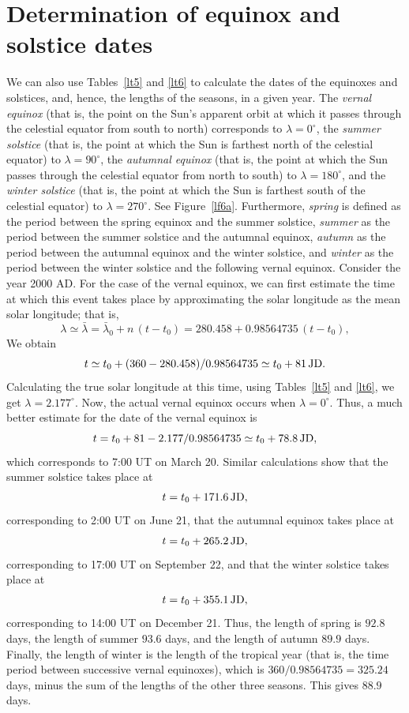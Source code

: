 \section{Determination of equinox and solstice dates}
We can also use Tables~\ref{lt5} and \ref{lt6} to calculate the dates of the equinoxes and solstices,
and, hence, the lengths of the seasons, in a given year. The {\em vernal equinox}\/ (that is, the point on the Sun's apparent orbit at which it passes through the celestial equator
from south to north)
corresponds to $\lambda=0^\circ$, the {\em summer solstice}\/ (that is, the
point at which the Sun is farthest north of the celestial equator) to $\lambda=90^\circ$, the {\em autumnal equinox}\/ (that is, the point at which the
Sun passes through the celestial equator from north to south) to $\lambda = 180^\circ$, and the
{\em winter solstice}\/ (that is, the point at which the Sun is farthest south of the celestial equator) to $\lambda = 270^\circ$. See Figure~\ref{lf6a}. Furthermore, {\em spring}\/ is defined as the period between the spring
equinox and the summer solstice, {\em summer}\/ as the period between the summer solstice and
the autumnal equinox, {\em autumn}\/ as the period between the autumnal equinox and the
winter solstice, and {\em winter}\/ as the period between the winter solstice and the following
vernal equinox. Consider the year 2000 AD.
For the case of the vernal equinox, we can
 first estimate the
 time at which this event takes place by approximating the solar
 longitude as the  mean
solar longitude; that is, 
$$
\lambda\simeq \bar{\lambda} = \bar{\lambda}_0 + n\,(t-t_0)
= 280.458 +  0.98564735\,(t-t_0),
$$
 We obtain 
$$
t \simeq t_0+(360-280.458)/0.98564735 \simeq t_0+81\,{\rm JD}.
$$ 
Calculating the true solar longitude at this time, using Tables~\ref{lt5} and \ref{lt6}, we get  
$\lambda = 2.177^\circ.$ Now, the actual vernal equinox occurs
when $\lambda=0^\circ$.
Thus, a much better estimate for the date of the vernal equinox
is
$$
t = t_0 + 81 -2.177/0.98564735 \simeq t_0 + 78.8\,{\rm JD},
$$
 which
corresponds to 7:00 UT on March 20. Similar calculations show that the summer solstice takes place at 
$$
t = t_0+ 171.6\, {\rm JD},
$$
corresponding to 2:00 UT on June 21, that the autumnal equinox
takes place at 
$$
t = t_0+265.2\,{\rm JD},
$$
corresponding to 17:00 UT
on September 22, and that the winter solstice takes place at
$$
t =t_0+355.1\, {\rm JD},
$$
corresponding to 14:00 UT on December 21. 
Thus, the length of spring is $92.8$ days,
the length of summer $93.6$ days,
and the length of autumn  $89.9$ days.
Finally, the length of winter is the length
of the tropical year (that is, the time period between successive vernal equinoxes), which is $360/0.98564735 = 325.24$ days, minus the sum of the lengths of the
other three seasons. This gives $88.9$ days. 

